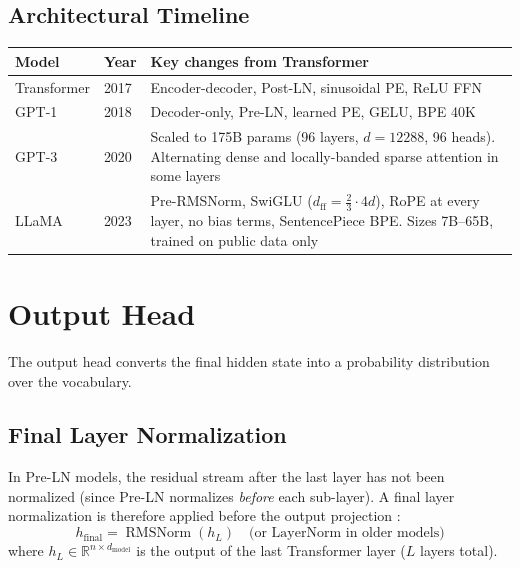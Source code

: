 \documentclass[11pt,a4paper]{article}
\newcommand{\R}{\mathbb{R}}
\newcommand{\RMSNorm}{\operatorname{RMSNorm}}
\newcommand{\dmodel}{d_{\text{model}}}
\newcommand{\dff}{d_{\text{ff}}}
\begin{document}
\subsection{Architectural Timeline}

\begin{center}
\begin{tabular}{llp{7.5cm}}
\toprule
\textbf{Model} & \textbf{Year} & \textbf{Key changes from Transformer} \\
\midrule
Transformer \cite{vaswani2017} & 2017 &
  Encoder-decoder, Post-LN, sinusoidal PE, ReLU FFN \\
GPT-1 \cite{radford2018} & 2018 &
  Decoder-only, Pre-LN\footnotemark, learned PE, GELU, BPE 40K \\
GPT-3 \cite{brown2020} & 2020 &
  Scaled to 175B params (96 layers, $d{=}12288$, 96 heads). Alternating dense and
  locally-banded sparse attention in some layers \\
LLaMA \cite{touvron2023} & 2023 &
  Pre-RMSNorm, SwiGLU ($\dff = \frac{2}{3} \cdot 4d$), RoPE at every layer, no bias
  terms, SentencePiece BPE. Sizes 7B--65B, trained on public data only \\
\bottomrule
\end{tabular}
\end{center}


\section{Output Head}
\label{sec:output-head}

The output head converts the final hidden state into a probability distribution over the
vocabulary.

\subsection{Final Layer Normalization}

In Pre-LN models, the residual stream after the last layer has not been normalized (since
Pre-LN normalizes \emph{before} each sub-layer). A final layer normalization is therefore
applied before the output projection \cite{xiong2020}:
\begin{equation}
  h_{\text{final}} = \RMSNorm(h_L) \quad \text{(or LayerNorm in older models)}
\end{equation}
where $h_L \in \R^{n \times \dmodel}$ is the output of the last Transformer layer ($L$ layers total).
\end{document}
